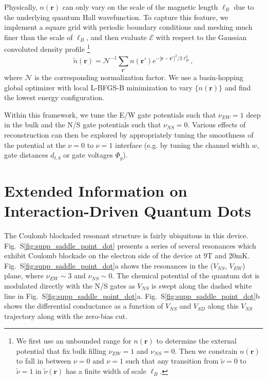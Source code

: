 \documentclass[reprint,prl,aps,superscriptaddress]{revtex4-1}
\newcommand{\abs}[1]{\left\lvert #1 \right\rvert}
\begin{document}
Physically, $n(\mathbf{r})$ can only vary on the scale of the magnetic length $\ell_B$ due to the underlying quantum Hall wavefunction. 
To capture this feature, we implement a square grid with periodic boundary conditions and meshing much finer than the scale of $\ell_B$,
and then evaluate $\mathcal{E}$ with respect to the Gaussian convoluted density profile \footnote{We first use an unbounded range for $n(\mathbf{r})$ to determine the external potential that fix bulk filling $\nu_{EW} = 1$ and $\nu_{NS} = 0$. Then we constrain $n(\mathbf{r})$ to fall in between $\nu = 0$ and $\nu = 1$ such that any transition from $\tilde{\nu} = 0$ to $\tilde{\nu} = 1$ in $\tilde \nu(\mathbf{r})$ has a finite width of scale $\ell_B$.}
\begin{equation}
    \tilde n(\mathbf{r}) = \mathcal{N}^{-1}\sum_{\mathbf{r}'} n(\mathbf r') e^{-\abs{\mathbf{r} - \mathbf{r}'}^2 / 2\ell_B^2},
\end{equation}
where $\mathcal{N}$ is the corresponding normalization factor.
We use a basin-hopping global optimizer with local L-BFGS-B minimization to vary $\{n(\mathbf{r})\}$ and find the lowest energy configuration.

Within this framework, we tune the E/W gate potentials such that $\nu_{EW}=1$ deep in the bulk and the N/S gate potentials such that $\nu_{NS}=0$. 
Various effects of reconstruction can then be explored by appropriately tuning the smoothness of the potential at the $\nu=0$ to $\nu=1$ interface (e.g. by tuning the channel width $w$, gate distances $d_{t,b}$ or gate voltages $\Phi_{g}$).



\section{Extended Information on Interaction-Driven Quantum Dots}
The Coulomb blockaded resonant structure is fairly ubiquitous in this device. Fig.~S\ref{fig:supp_saddle_point_dot} presents a series of several resonances which exhibit Coulomb blockade on the electron side of the device at 9T and 20mK.  Fig.~S\ref{fig:supp_saddle_point_dot}a shows the resonances in the ($V_{NS}$, $V_{EW}$) plane, where $\nu_{EW} \sim 3$ and $\nu_{NS} \sim 0$.  The chemical potential of the quantum dot is modulated directly with the N/S gates as $V_{NS}$ is swept along the dashed white line in Fig.~S\ref{fig:supp_saddle_point_dot}a.  Fig.~S\ref{fig:supp_saddle_point_dot}b shows the differential conductance as a function of $V_{NS}$ and $V_{SD}$ along this $V_{NS}$ trajectory along with the zero-bias cut.  
\end{document}
